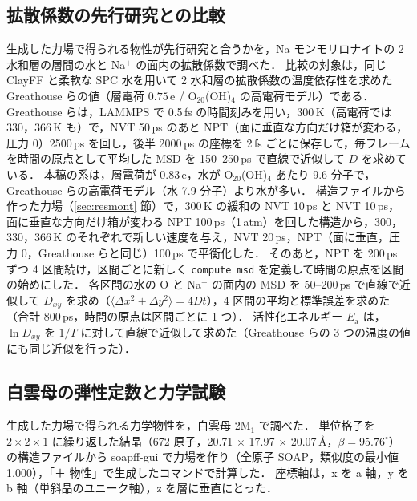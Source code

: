 \documentclass[a4paper,11pt]{article}
\newcommand{\e}{\,e}
\begin{document}
\subsection{拡散係数の先行研究との比較}
\label{sec:diffmethod}
生成した力場で得られる物性が先行研究と合うかを，Na モンモリロナイトの 2 水和層の層間の水と Na$^+$ の面内の拡散係数で調べた．
比較の対象は，同じ ClayFF と柔軟な SPC 水を用いて 2 水和層の拡散係数の温度依存性を求めた Greathouse ら\cite{greathouse2016}の値（層電荷 $0.75$\e{} / O$_{20}$(OH)$_4$ の高電荷モデル）である．
Greathouse らは，LAMMPS で 0.5\,fs の時間刻みを用い，300\,K（高電荷では 330，366\,K も）で，NVT 50\,ps のあと NPT（面に垂直な方向だけ箱が変わる，圧力 0）2500\,ps を回し，後半 2000\,ps の座標を 2\,fs ごとに保存して，毎フレームを時間の原点として平均した MSD を 150--250\,ps で直線で近似して $D$ を求めている．
本稿の系は，層電荷が $0.83$\e{}，水が O$_{20}$(OH)$_4$ あたり 9.6 分子で，Greathouse らの高電荷モデル（水 7.9 分子）より水が多い．
構造ファイルから作った力場（\ref{sec:resmont} 節）で，300\,K の緩和の NVT 10\,ps と NVT 10\,ps，面に垂直な方向だけ箱が変わる NPT 100\,ps（1\,atm）を回した構造から，300，330，366\,K のそれぞれで新しい速度を与え，NVT 20\,ps，NPT（面に垂直，圧力 0，Greathouse らと同じ）100\,ps で平衡化した．
そのあと，NPT を 200\,ps ずつ 4 区間続け，区間ごとに新しく \texttt{compute msd} を定義して時間の原点を区間の始めにした．
各区間の水の O と Na$^+$ の面内の MSD を 50--200\,ps で直線で近似して $D_{xy}$ を求め（$\langle\Delta x^2+\Delta y^2\rangle=4Dt$），4 区間の平均と標準誤差を求めた（合計 800\,ps，時間の原点は区間ごとに 1 つ）．
活性化エネルギー $E_\mathrm{a}$ は，$\ln D_{xy}$ を $1/T$ に対して直線で近似して求めた（Greathouse らの 3 つの温度の値にも同じ近似を行った）．

\subsection{白雲母の弾性定数と力学試験}
\label{sec:mechmethod}
生成した力場で得られる力学物性を，白雲母 2M$_1$ で調べた．
単位格子を $2\times2\times1$ に繰り返した結晶（672 原子，20.71 $\times$ 17.97 $\times$ 20.07\,\AA，$\beta=95.76^\circ$）の構造ファイルから soapff-gui で力場を作り（全原子 SOAP，類似度の最小値 1.000），「＋ 物性」で生成したコマンドで計算した．
座標軸は，x を a 軸，y を b 軸（単斜晶のユニーク軸），z を層に垂直にとった．
\end{document}
